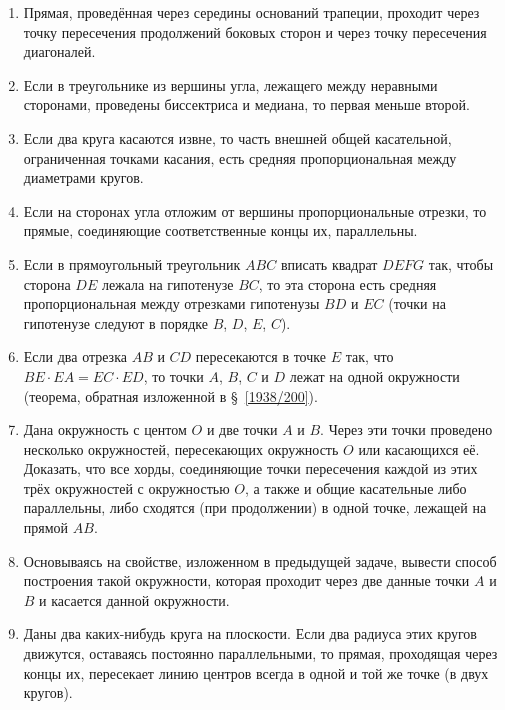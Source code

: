 \documentclass[twoside]{book}
\begin{document}
\begin{enumerate}

 \item
Прямая, проведённая через середины оснований трапеции, проходит через точку пересечения продолжений боковых сторон и через точку пересечения диагоналей.

 \item
Если в треугольнике из вершины угла, лежащего между неравными сторонами, проведены биссектриса и медиана, то первая меньше второй.

 \item
Если два круга касаются извне, то часть внешней общей касательной, ограниченная точками касания, есть средняя пропорциональная между диаметрами кругов.

 \item
Если на сторонах угла отложим от вершины пропорциональные отрезки, то прямые, соединяющие соответственные концы их, параллельны.

 \item
Если в прямоугольный треугольник $ABC$ вписать квадрат $DEFG$ так, чтобы сторона $DE$ лежала на гипотенузе $BC$, то эта сторона есть средняя пропорциональная между отрезками гипотенузы $BD$ и $EC$ (точки на гипотенузе следуют в порядке $B$, $D$, $E$, $C$).

 \item
Если два отрезка $AB$ и $CD$ пересекаются в точке $E$ так, что $BE\cdot  EA=EC\cdot  ED$, то точки $A$, $B$, $C$ и $D$ лежат на одной окружности (теорема, обратная изложенной в §~\ref{1938/200}).

 \item
Дана окружность с центом $O$ и две точки $A$ и $B$.
Через эти точки проведено несколько окружностей, пересекающих окружность $O$ или касающихся её.
Доказать, что все хорды, соединяющие точки пересечения каждой из этих трёх окружностей с окружностью $O$, а также и общие касательные либо параллельны, либо сходятся (при продолжении) в одной точке, лежащей на прямой $AB$. 

 \item
Основываясь на свойстве, изложенном в предыдущей задаче, вывести способ построения такой окружности, которая проходит через две данные точки $A$ и $B$ и касается данной окружности.

 \item
Даны два каких-нибудь круга на плоскости.
Если два радиуса этих кругов движутся, оставаясь постоянно параллельными, то прямая, проходящая через концы их, пересекает линию центров всегда в одной и той же точке (в  двух кругов).


\end{enumerate}
\end{document}
